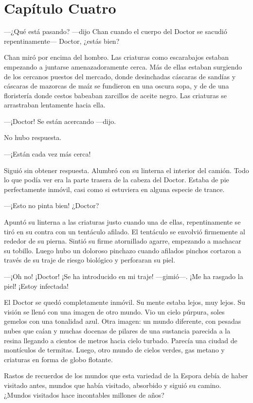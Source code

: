 \chapter*{Capítulo Cuatro}

---¿Qué está pasando? ---dijo Chan cuando el cuerpo del Doctor se
sacudió repentinamente--- Doctor, ¿estás bien?

Chan miró por encima del hombro. Las criaturas como escarabajos estaban
empezando a juntarse amenazadoramente cerca. Más de ellas estaban
surgiendo de los cercanos puestos del mercado, donde desinchadas
cáscaras de sandías y cáscaras de mazorcas de maíz se fundieron en una
oscura sopa, y de de una floristería donde cestos babeaban zarcillos de
aceite negro. Las criaturas se arrastraban lentamente hacia ella.

---¡Doctor! Se están acercando ---dijo.

No hubo respuesta.

---¡Están cada vez más cerca!

Siguió sin obtener respuesta. Alumbró con su linterna el interior del
camión. Todo lo que podía ver era la parte trasera de la cabeza del
Doctor. Estaba de pie perfectamente inmóvil, casi como si estuviera en
alguna especie de trance.

---¡Esto no pinta bien! ¿Doctor?

Apuntó su linterna a las criaturas justo cuando una de ellas,
repentinamente se tiró en su contra con un tentáculo afilado. El
tentáculo se envolvió firmemente al rededor de su pierna. Sintió su
firme atornillado agarre, empezando a machacar su tobillo. Luego hubo un
doloroso pinchazo cuando afilados pinchos cortaron a través de su traje
de riesgo biológico y perforaran su piel.

---¡Oh no! ¡Doctor! ¡Se ha introducido en mi traje! ---gimió---. ¡Me ha
rasgado la piel! ¡Estoy infectada!

El Doctor se quedó completamente inmóvil. Su mente estaba lejos, muy
lejos. Su visión se llenó con una imagen de otro mundo. Vio un cielo
púrpura, soles gemelos con una tonalidad azul. Otra imagen: un mundo
diferente, con pesadas nubes que caían y muchas docenas de pilares de
una sustancia parecida a la resina llegando a cientos de metros hacia
cielo turbado. Parecía una ciudad de montículos de termitas. Luego, otro
mundo de cielos verdes, gas metano y criaturas en forma de globo
flotante.

Rastos de recuerdos de los mundos que esta variedad de la Espora debía
de haber visitado antes, mundos que había visitado, absorbido y siguió
su camino. ¿Mundos visitados hace incontables millones de años?

